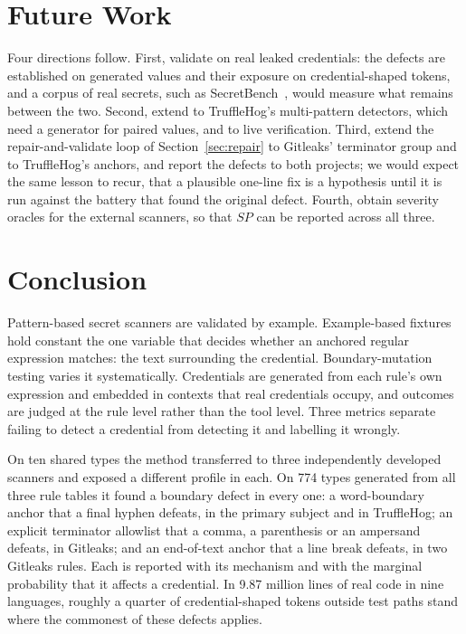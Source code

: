 \documentclass[pdflatex,sn-basic]{sn-jnl}
\begin{document}
\section{Future Work}
\label{sec:future}

Four directions follow. First, validate on real leaked credentials: the defects are established on generated values and their exposure on credential-shaped tokens, and a corpus of real secrets, such as SecretBench~\citep{basak2023secretbench}, would measure what remains between the two. Second, extend to TruffleHog's multi-pattern detectors, which need a generator for paired values, and to live verification. Third, extend the repair-and-validate loop of Section~\ref{sec:repair} to Gitleaks' terminator group and to TruffleHog's anchors, and report the defects to both projects; we would expect the same lesson to recur, that a plausible one-line fix is a hypothesis until it is run against the battery that found the original defect. Fourth, obtain severity oracles for the external scanners, so that $SP$ can be reported across all three.

\section{Conclusion}

Pattern-based secret scanners are validated by example. Example-based fixtures hold constant the one variable that decides whether an anchored regular expression matches: the text surrounding the credential. Boundary-mutation testing varies it systematically. Credentials are generated from each rule's own expression and embedded in contexts that real credentials occupy, and outcomes are judged at the rule level rather than the tool level. Three metrics separate failing to detect a credential from detecting it and labelling it wrongly.

On ten shared types the method transferred to three independently developed scanners and exposed a different profile in each. On 774 types generated from all three rule tables it found a boundary defect in every one: a word-boundary anchor that a final hyphen defeats, in the primary subject and in TruffleHog; an explicit terminator allowlist that a comma, a parenthesis or an ampersand defeats, in Gitleaks; and an end-of-text anchor that a line break defeats, in two Gitleaks rules. Each is reported with its mechanism and with the marginal probability that it affects a credential. In 9.87 million lines of real code in nine languages, roughly a quarter of credential-shaped tokens outside test paths stand where the commonest of these defects applies.
\end{document}
